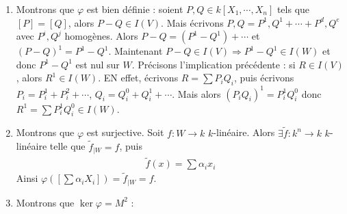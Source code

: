             \begin{enumerate}
                \item Montrons que $\varphi$ est bien définie : soient $P,Q \in k[X_1, \cdots, X_n]$ tels que $[P] = [Q]$, alors $P - Q \in I(V)$. Mais écrivons $P,Q = P^1,Q^1 + \cdots + P^d,Q^e$ avec $P^i,Q^j$ homogènes. Alors $P-Q = (P^1 - Q^1) + \cdots$ et $(P - Q)^1 = P^1 - Q^1$. Maintenant $P - Q \in I(V) \Rightarrow P^1 - Q^1 \in I(W)$ et donc $P^1 - Q^1$ est nul sur $W$. Précisons l'implication précédente : si $R \in I(V)$, alors $R^1 \in I(W)$. EN effet, écrivons $R = \sum P_iQ_i$, puis écrivons $P_i = P_i^1 + P_i^2 + \cdots$, $Q_i = Q_i^0 + Q_i^1 + \cdots$. Mais alors $(P_iQ_i)^1 = P_i^1Q_i^0$ donc $R^1 = \sum P_i^1Q_i^0 \in I(W)$.
                \item Montrons que $\varphi$ est surjective. Soit $f : W \to k$ $k$-linéaire. Alors $\exists \tilde f : k^n \to k$ $k$-linéaire telle que $\tilde f_{|W} = f$, puis 
                \begin{align*}
                    \tilde f(x) = \sum \alpha_i x_i
                \end{align*}
                Ainsi $\varphi([\sum \alpha_i X_i]) = \tilde f_{|W} = f$.
                \item Montrons que $\ker \varphi = M^2$ :    
            \end{enumerate}